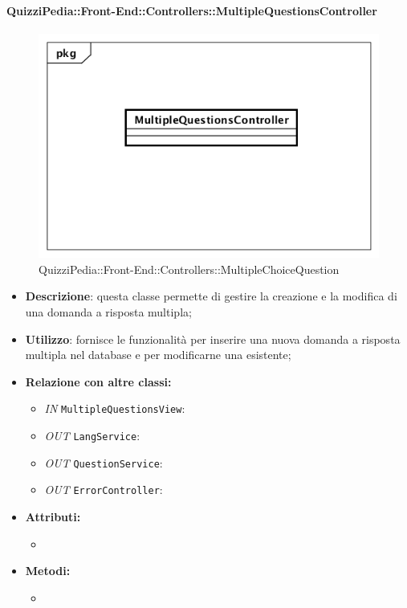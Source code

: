 \paragraph{QuizziPedia::Front-End::Controllers::MultipleQuestionsController}
\begin{figure}
	\centering
	\includegraphics[scale=0.45]{UML/Classi/Front-End/QuizziPedia_Front-end_Controller_MultipleQuestionsController.png}
	\caption{QuizziPedia::Front-End::Controllers::MultipleChoiceQuestion}
\end{figure}
\begin{itemize}
	\item \textbf{Descrizione}: questa classe permette di gestire la creazione e la modifica di una domanda a risposta multipla;
	\item \textbf{Utilizzo}: fornisce le funzionalità per inserire una nuova domanda a risposta multipla nel database e per modificarne una esistente;
	\item \textbf{Relazione con altre classi:}
	\begin{itemize}
		\item \textit{IN} \texttt{MultipleQuestionsView}:  
		\item \textit{OUT} \texttt{LangService}: 
		\item \textit{OUT} \texttt{QuestionService}:
		\item \textit{OUT} \texttt{ErrorController}: 
	\end{itemize}
	\item \textbf{Attributi:}
	\begin{itemize}
		\item 
	\end{itemize}
	\item \textbf{Metodi:}
	\begin{itemize}
		\item 
	\end{itemize}
\end{itemize}


